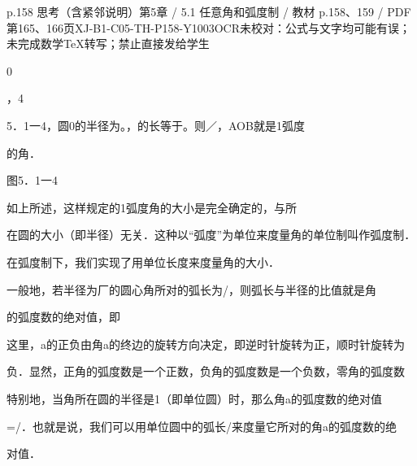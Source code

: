 \begin{bankitem}{p.158 思考（含紧邻说明）}{第5章 / 5.1 任意角和弧度制 / 教材 p.158、159 / PDF 第165、166页}{XJ-B1-C05-TH-P158-Y1003}{OCR未校对：公式与文字均可能有误；未完成数学TeX转写；禁止直接发给学生}
\begin{ocrdraft}
0
\par
，4
\par
5．1一4，圆0的半径为。，的长等于。则／，AOB就是1弧度
\par
的角．
\par
图5．1一4
\par
如上所述，这样规定的1弧度角的大小是完全确定的，与所
\par
在圆的大小（即半径）无关．这种以“弧度”为单位来度量角的单位制叫作弧度制．
\par
在弧度制下，我们实现了用单位长度来度量角的大小．
\par
一般地，若半径为厂的圆心角所对的弧长为/，则弧长与半径的比值就是角
\par
的弧度数的绝对值，即
\par
这里，a的正负由角a的终边的旋转方向决定，即逆时针旋转为正，顺时针旋转为
\par
负．显然，正角的弧度数是一个正数，负角的弧度数是一个负数，零角的弧度数
\par
特别地，当角所在圆的半径是1（即单位圆）时，那么角a的弧度数的绝对值
\par
=/．也就是说，我们可以用单位圆中的弧长/来度量它所对的角a的弧度数的绝
\par
对值．
\end{ocrdraft}
\end{bankitem}
